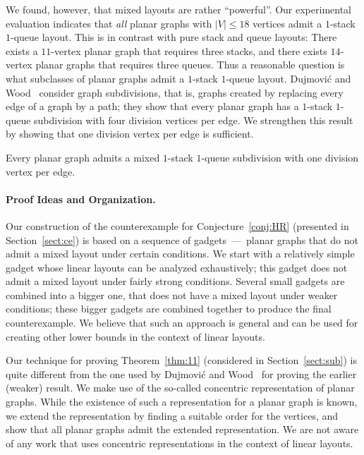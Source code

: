 \documentclass[orivec]{llncs}
\newcommand{\df}[1]{{\it #1}}
\newcommand{\wormholeThm}[1]{
    \newcounter{#1}
    \setcounter{#1}{\value{theorem}}}
\begin{document}
We found, however, that mixed layouts are rather ``powerful''. Our experimental evaluation indicates that
\df{all} planar graphs with $|V| \le 18$ vertices admit a $1$-stack $1$-queue layout. This is in contrast
with pure stack and queue layouts: There exists a $11$-vertex planar graph that requires three stacks, and
there exists $14$-vertex planar graphs that requires three queues. Thus a reasonable question is what subclasses of 
planar graphs admit a $1$-stack $1$-queue layout. Dujmovi{\'c} and Wood~\cite{DW05} consider graph
subdivisions, that is, graphs created by replacing every edge of a graph by a path; they show that every 
planar graph has a $1$-stack $1$-queue 
subdivision with four division vertices per edge. We strengthen this result by showing that one division vertex
per edge is sufficient.

\wormholeThm{thm-11}
\begin{theorem}
    \label{thm:11}
    Every planar graph admits a mixed $1$-stack $1$-queue subdivision with one division vertex per edge.
\end{theorem}

\paragraph{Proof Ideas and Organization.}

Our construction of the counterexample for Conjecture~\ref{conj:HR} (presented in Section~\ref{sect:ce}) is based
on a sequence of gadgets~---~planar graphs that do not admit a mixed layout under certain conditions. We start
with a relatively simple gadget whose linear layouts can be analyzed exhaustively; this gadget does not
admit a mixed layout under fairly strong conditions. Several small gadgets are combined into a bigger one, that does not
have a mixed layout under weaker conditions; these bigger gadgets are combined together to produce the final counterexample.
We believe that such an approach is general and can be used for creating other lower bounds in the context of linear layouts.

Our technique for proving Theorem~\ref{thm:11} (considered in Section~\ref{sect:sub}) is quite different from
the one used by Dujmovi{\'c} and Wood~\cite{DW05} for proving the earlier (weaker) result.
We make use of the so-called concentric representation of planar graphs.
While the existence of such a representation for a planar graph is known, we extend the representation by finding
a suitable order for the vertices, and show that all planar graphs admit the extended representation.
We are not aware of any work that uses concentric representations in the context of linear layouts.
\end{document}
